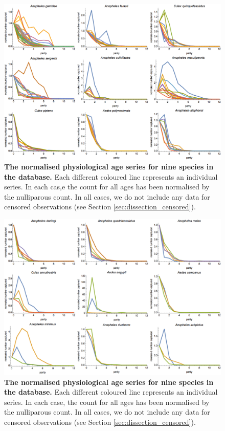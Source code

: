 \documentclass[12pt]{article}
\begin{document}
{\begin{figure}[ht]
	\centerline{\includegraphics[width=1.3\textwidth]{./Figure_files/dissection_parity_data1.png}}
	\caption{\textbf{The normalised physiological age series for nine species in the database.} Each different coloured line represents an individual series. In each cas,e the count for all ages has been normalised by the nulliparous count. In all cases, we do not include any data for censored observations (see Section \ref{sec:dissection_censored}).}\label{fig:dissection_exampleData1}
\end{figure}

\begin{figure}[ht]
	\centerline{\includegraphics[width=1.3\textwidth]{./Figure_files/dissection_parity_data2.png}}
	\caption{\textbf{The normalised physiological age series for nine species in the database.} Each different coloured line represents an individual series. In each case, the count for all ages has been normalised by the nulliparous count. In all cases, we do not include any data for censored observations (see Section \ref{sec:dissection_censored}).}\label{fig:dissection_exampleData2}
\end{figure}

}
\end{document}

